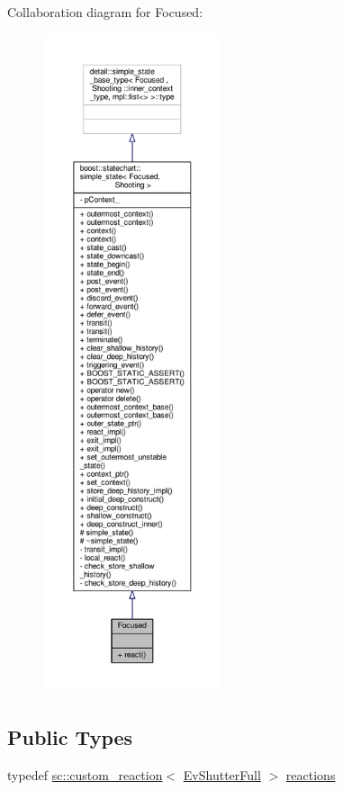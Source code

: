 Collaboration diagram for Focused\+:
\nopagebreak
\begin{figure}[H]
\begin{center}
\leavevmode
\includegraphics[height=550pt]{struct_focused__coll__graph}
\end{center}
\end{figure}
\subsection*{Public Types}
\begin{DoxyCompactItemize}
\item 
typedef \mbox{\hyperlink{classboost_1_1statechart_1_1custom__reaction}{sc\+::custom\+\_\+reaction}}$<$ \mbox{\hyperlink{struct_ev_shutter_full}{Ev\+Shutter\+Full}} $>$ \mbox{\hyperlink{struct_focused_a4c79851d21e90dd5408133ea35aa6fac}{reactions}}
\end{DoxyCompactItemize}
